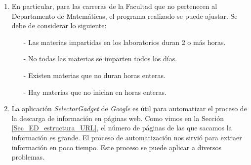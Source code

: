 \begin{enumerate}
\item En particular, para las carreras de la Facultad que no pertenecen al Departamento de Matemáticas, el programa realizado se puede ajustar. Se debe de considerar lo siguiente: %

%
%
%

\begin{itemize}
\item[-] Las materias impartidas en los laboratorios duran 2 o más horas.

\item[-] No todas las materias se imparten todos los días.

\item[-] Existen materias que no duran horas enteras.

\item[-] Hay materias que no inician en horas enteras.
\end{itemize}

\item La aplicación \textit{SelectorGadget} de \textit{Google} es útil para automatizar el proceso de la descarga de información en páginas web. Como vimos en la Sección \ref{Sec_ED_estructura_URL}, el número de páginas de las que sacamos la información es grande. El proceso de automatización nos sirvió para extraer información en poco tiempo. Este proceso se puede aplicar a diversos problemas. %

\end{enumerate}


